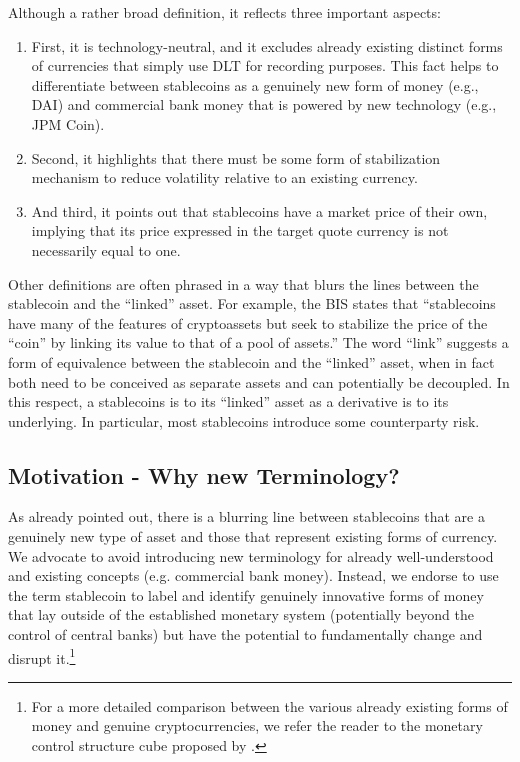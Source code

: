 \documentclass[conference]{IEEEtran}
\begin{document}
Although a rather broad definition, it reflects three important aspects:
\begin{enumerate}
	\item First, it is technology-neutral, and it excludes already existing distinct forms of currencies that simply use \ac{DLT} for recording purposes. This fact helps to differentiate between stablecoins as a genuinely new form of money (e.g., DAI) and commercial bank money that is powered by new technology (e.g., JPM Coin).
	\item Second, it highlights that there must be some form of stabilization mechanism to reduce volatility relative to an existing currency.
	\item And third, it points out that stablecoins have a market price of their own, implying that its price expressed in the target quote currency is not necessarily equal to one.
\end{enumerate}

Other definitions are often phrased in a way that blurs the lines between the stablecoin and the ``linked'' asset. For example, the \ac{BIS} states that ``stablecoins have many of the features of cryptoassets but seek to stabilize the price of the ``coin'' by linking its value to that of a pool of assets.'' The word ``link'' suggests a form of equivalence between the stablecoin and the ``linked'' asset, when in fact both need to be conceived as separate assets and can potentially be decoupled. In this respect, a stablecoins is to its ``linked'' asset as a derivative is to its underlying. In particular, most stablecoins introduce some counterparty risk.

\subsection{Motivation - Why new Terminology?}
\label{sec:disruption}
As already pointed out, there is a blurring line between stablecoins that are a genuinely new type of asset and those that represent existing forms of currency. We advocate to avoid introducing new terminology for already well-understood and existing concepts (e.g. commercial bank money). Instead, we endorse to use the term stablecoin to label and identify genuinely innovative forms of money that lay outside of the established monetary system (potentially beyond the control of central banks) but have the potential to fundamentally change and disrupt it.\footnote{For a more detailed comparison between the various already existing forms of money and genuine cryptocurrencies, we refer the reader to the monetary control structure cube proposed by \cite{Berentsen}.}\\
\end{document}
